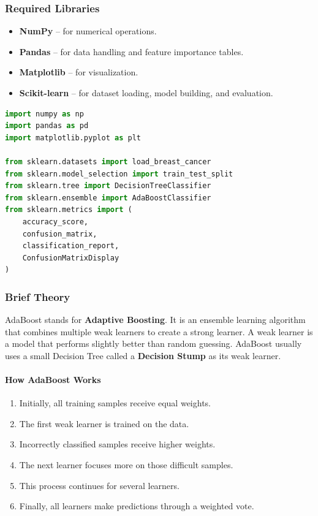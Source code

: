 \documentclass[a4paper,11pt]{article}
\begin{document}
\subsubsection{Required Libraries}
\begin{itemize}
    \item \textbf{NumPy} -- for numerical operations.
    \item \textbf{Pandas} -- for data handling and feature importance tables.
    \item \textbf{Matplotlib} -- for visualization.
    \item \textbf{Scikit-learn} -- for dataset loading, model building, and evaluation.
\end{itemize}

\begin{lstlisting}[language=Python, caption={Required Imports}]
import numpy as np
import pandas as pd
import matplotlib.pyplot as plt

from sklearn.datasets import load_breast_cancer
from sklearn.model_selection import train_test_split
from sklearn.tree import DecisionTreeClassifier
from sklearn.ensemble import AdaBoostClassifier
from sklearn.metrics import (
    accuracy_score,
    confusion_matrix,
    classification_report,
    ConfusionMatrixDisplay
)
\end{lstlisting}

\subsubsection{Brief Theory}
AdaBoost stands for \textbf{Adaptive Boosting}. It is an ensemble learning algorithm that combines multiple weak learners to create a strong learner. A weak learner is a model that performs slightly better than random guessing. AdaBoost usually uses a small Decision Tree called a \textbf{Decision Stump} as its weak learner.

\paragraph{How AdaBoost Works}
\begin{enumerate}
    \item Initially, all training samples receive equal weights.
    \item The first weak learner is trained on the data.
    \item Incorrectly classified samples receive higher weights.
    \item The next learner focuses more on those difficult samples.
    \item This process continues for several learners.
    \item Finally, all learners make predictions through a weighted vote.
\end{enumerate}
\end{document}
